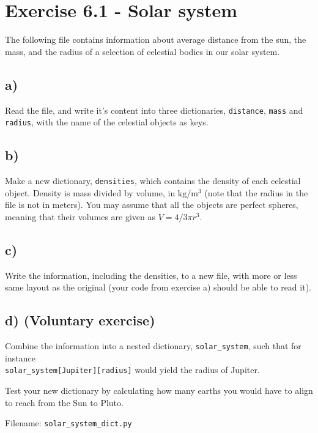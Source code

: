 \documentclass[10pt,a4paper]{article}
\begin{document}
\section*{Exercise 6.1 - Solar system}

The following file  contains information about average distance from the sun, the mass, and the radius of a selection of celestial bodies in our solar system.



\subsection*{a)}
Read the file, and write it's content into three dictionaries, \texttt{distance}, \texttt{mass} and \texttt{radius}, with the name of the celestial objects as keys.

\subsection*{b)}
Make a new dictionary, \texttt{densities}, which contains the density of each celestial object. Density is mass divided by volume, in $\mathrm{kg/m^3}$ (note that the radius in the file is not in meters). You may assume that all the objects are perfect spheres, meaning that their volumes are given as $V = 4/3\pi r^3$.

\subsection*{c)}
Write the information, including the densities, to a new file, with more or less same layout as the original (your code from exercise a) should be able to read it).

\subsection*{d) (Voluntary exercise)}

Combine the information into a nested dictionary, \texttt{solar\_system}, such that for instance\\
\texttt{solar\_system[Jupiter][radius]} would yield the radius of Jupiter.

Test your new dictionary by calculating how many earths you would have to align to reach from the Sun to Pluto.

Filename: \texttt{solar\_system\_dict.py}
\end{document}
